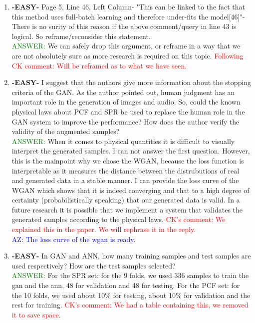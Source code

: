 \documentclass{article}
\begin{document}
\begin{enumerate}
   
	\item \textbf{-EASY-} Page 5, Line 46, Left Column- "This can be linked to the fact that this method uses full-batch learning and therefore under-fits the model[46]"- There is no surity of this reason if the above comment/query in line 43 is logical. So reframe/reconsider this statement. \\
	
	\textcolor{green}{ANSWER: } We can safely drop this argument, or reframe in a way that we are not absolutely sure as more research is required on this topic. \textcolor{red}{Following CK comment: Will be reframed as to what we have seen.}

	\item \textbf{-EASY-} I suggest that the authors give more information about the stopping criteria of the GAN. As the author pointed out, human judgment has an important role in the generation of images and audio. So, could the known physical laws about PCF and SPR be used to replace the human role in the GAN system to improve the performance? How does the author verify the validity of the augmented samples? \\
	\textcolor{green}{ANSWER: } When it comes to physical quantities it is difficult to visually interpret the generated samples. I can not answer the first question. However, this is the mainpoint why we chose the WGAN, because the loss function is interpretable as it measures the distance between the distrubutions of real and generated data in a stable manner. I can provide the loss curve of the WGAN which shows that it is indeed converging and that to a high degree of certainty (probabilistically speaking) that our generated data is valid. In a future research it is possible that we implement a system that validates the generated samples according to the physical laws. \textcolor{red}{CK's comment: We explained this in the paper. We will rephrase it in the reply. } \\ \textcolor{blue}{AZ: The loss curve of the wgan is ready.}

\item \textbf{-EASY-} In GAN and ANN, how many training samples and test samples are used respectively? How are the test samples selected? \\
\textcolor{green}{ANSWER: } For the SPR set: for the 9 folds, we used 336 samples to train the gan and the ann, 48 for validation and 48 for testing. For the PCF set: for the 10 folds, we used about 10\% for testing, about 10\% for validation and the rest for training. \textcolor{red}{CK's comment: We had a table containing this, we removed it to save space.}


\end{enumerate}
\end{document}
